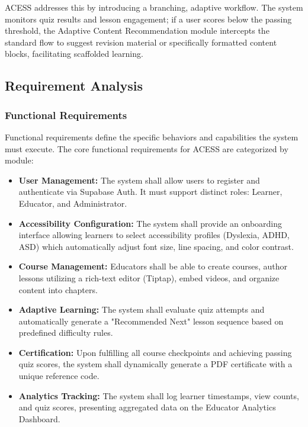 \documentclass[12pt,a4paper]{report}
\begin{document}
ACESS addresses this by introducing a branching, adaptive workflow. The system monitors quiz results and lesson engagement; if a user scores below the passing threshold, the Adaptive Content Recommendation module intercepts the standard flow to suggest revision material or specifically formatted content blocks, facilitating scaffolded learning.

\subsection{Requirement Analysis}

\subsubsection{Functional Requirements}
Functional requirements define the specific behaviors and capabilities the system must execute. The core functional requirements for ACESS are categorized by module:

\begin{itemize}[itemsep=-1mm]
\item \textbf{User Management:} The system shall allow users to register and authenticate via Supabase Auth. It must support distinct roles: Learner, Educator, and Administrator.
\item \textbf{Accessibility Configuration:} The system shall provide an onboarding interface allowing learners to select accessibility profiles (Dyslexia, ADHD, ASD) which automatically adjust font size, line spacing, and color contrast.
\item \textbf{Course Management:} Educators shall be able to create courses, author lessons utilizing a rich-text editor (Tiptap), embed videos, and organize content into chapters.
\item \textbf{Adaptive Learning:} The system shall evaluate quiz attempts and automatically generate a "Recommended Next" lesson sequence based on predefined difficulty rules.
\item \textbf{Certification:} Upon fulfilling all course checkpoints and achieving passing quiz scores, the system shall dynamically generate a PDF certificate with a unique reference code.
\item \textbf{Analytics Tracking:} The system shall log learner timestamps, view counts, and quiz scores, presenting aggregated data on the Educator Analytics Dashboard.
\end{itemize}
\end{document}
